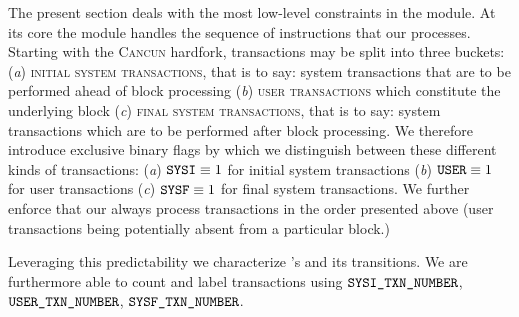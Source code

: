 The present section deals with the most low-level constraints in the \hubMod{} module.
At its core the \hubMod{} module handles the sequence of instructions that our \zkEvm{} processes.
Starting with the \textsc{Cancun} hardfork, \evm{} transactions may be split into three buckets:
(\emph{a}) \textsc{initial system transactions}, that is to say: system transactions that are to be performed ahead of block processing
(\emph{b}) \textsc{user transactions} which constitute the underlying block
(\emph{c}) \textsc{final system transactions}, that is to say: system transactions which are to be performed after block processing.
We therefore introduce exclusive binary flags by which we distinguish between these different kinds of transactions:
(\emph{a}) $\texttt{SYSI} \equiv 1$ for initial system transactions
(\emph{b}) $\texttt{USER} \equiv 1$ for user transactions
(\emph{c}) $\texttt{SYSF} \equiv 1$ for final system transactions.
We further enforce that our \zkEvm{} always process transactions in the order presented above
(user transactions being potentially absent from a particular block.)

Leveraging this predictability we characterize \blockNumber{}'s and its transitions.
We are furthermore able to count and label transactions using
$\texttt{SYSI}\texttt{\_}\texttt{TXN\_NUMBER}$,
$\texttt{USER}\texttt{\_}\texttt{TXN\_NUMBER}$,
$\texttt{SYSF}\texttt{\_}\texttt{TXN\_NUMBER}$.

